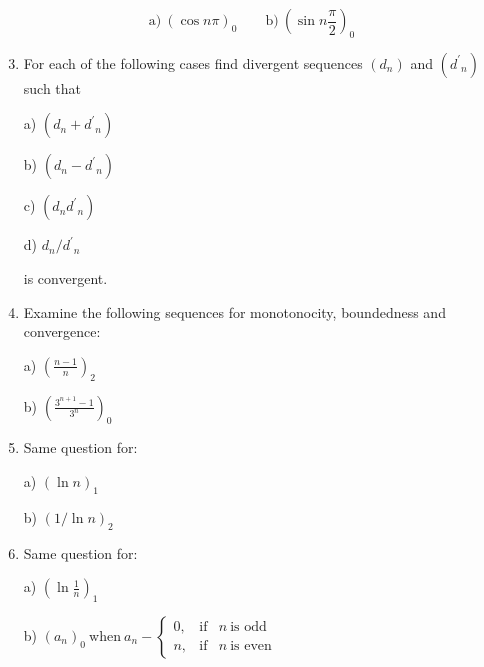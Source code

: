 \documentclass[11pt]{amsbook}
\begin{document}

\[
	\text{a)}\ (\cos n\pi)_0 \qquad \text{b)}\ (\sin n\frac{\pi}{2})_0
\]

\begin{enumerate}
	\setcounter{enumi}{2}

	\item
  For each of the following cases find divergent sequences $(d_n)$ and
  $({d^\prime}_n)$ such that

  \begin{multicols}{2}
  	a) $ (d_n + {d^\prime}_n) $

  	b) $ (d_n - {d^\prime}_n) $
  \end{multicols}
  \begin{multicols}{2}
  	c) $ (d_n {d^\prime}_n) $

  	d) $ d_n / {d^\prime}_n $
  \end{multicols}

  \noindent is convergent.\\

	\item
  Examine the following sequences for monotonocity, boundedness and convergence:

  \begin{multicols}{2}
  	a) $(\frac{n-1}{n})_2$

  	b) $(\frac{3^{n+1} - 1}{3^n})_0$
  \end{multicols}

	\item
  Same question for:

  \begin{multicols}{2}
  	a) $(\ln n)_1$

  	b) $(1 / \ln n)_2$
  \end{multicols}

	\item
  Same question for:

  \begin{minipage}{0.35\textwidth}
  	a) $(\ln \frac{1}{n})_1$
  \end{minipage}%
  \begin{minipage}{0.65\textwidth}
  	b) $(a_n)_0\ \text{when}\ a_n - \left \{
  	\begin{array}{rcl}
  		0, & \text{if} & n \ \text{is odd}  \\
  		n, & \text{if} & n \ \text{is even}
  	\end{array} \right.$
  \end{minipage}


\end{enumerate}
\end{document}
